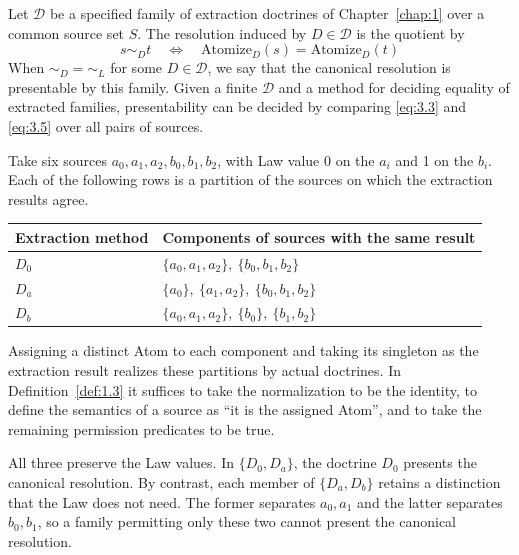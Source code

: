 \begin{definition}\label{def:3.7}

Let $\mathcal{D}$ be a specified family of extraction doctrines of
Chapter~\ref{chap:1} over a common source set $S$.
The resolution induced by $D\in\mathcal{D}$ is the quotient by
\begin{equation*}
s\sim_D t
\quad\Longleftrightarrow\quad
\mathrm{Atomize}_D(s)=\mathrm{Atomize}_D(t)
\tag{3.5}\label{eq:3.5}
\end{equation*}
When $\sim_D=\sim_L$ for some $D\in\mathcal{D}$, we say that the canonical resolution
is presentable by this family.
Given a finite $\mathcal{D}$ and a method for deciding equality of extracted families,
presentability can be decided by comparing \eqref{eq:3.3} and \eqref{eq:3.5} over all
pairs of sources.

\end{definition}

\begin{example}\label{ex:3.8}

Take six sources $a_0,a_1,a_2,b_0,b_1,b_2$, with Law value 0 on the $a_i$ and 1 on
the $b_i$. Each of the following rows is a partition of the sources on which the
extraction results agree.

\begin{xltabular}{\linewidth}{@{}LL@{}}
\toprule
Extraction method & Components of sources with the same result \\
\midrule
\endhead
$D_0$ & $\{a_0,a_1,a_2\},\ \{b_0,b_1,b_2\}$ \\
\addlinespace[3pt]
$D_a$ & $\{a_0\},\ \{a_1,a_2\},\ \{b_0,b_1,b_2\}$ \\
\addlinespace[3pt]
$D_b$ & $\{a_0,a_1,a_2\},\ \{b_0\},\ \{b_1,b_2\}$ \\
\bottomrule
\end{xltabular}

Assigning a distinct Atom to each component and taking its singleton as the
extraction result realizes these partitions by actual doctrines. In
Definition~\ref{def:1.3} it suffices to take the normalization to be the identity, to
define the semantics of a source as ``it is the assigned Atom'', and to take the
remaining permission predicates to be true.

All three preserve the Law values. In $\{D_0,D_a\}$, the doctrine $D_0$ presents the
canonical resolution. By contrast, each member of $\{D_a,D_b\}$ retains a distinction
that the Law does not need. The former separates $a_0,a_1$ and the latter
separates $b_0,b_1$, so a family permitting only these two cannot present the
canonical resolution.

\end{example}


